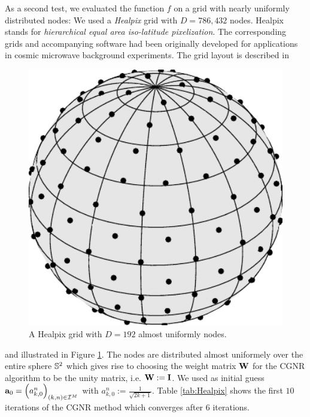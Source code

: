 \begin{example}
    As a second test, we evaluated the function $f$ on a grid with nearly uniformly distributed
    nodes: We used a \emph{Healpix} grid with $D=786,432$ nodes. Healpix stands for 
    \emph{hierarchical equal area iso-latitude pixelization}. The corresponding grids 
    and accompanying software had been originally developed for applications in 
    cosmic microwave background experiments. The grid layout is described in  
    \begin{figure}[tb]
      \centering
      \includegraphics[width=12cm]{images/healpix}
      \caption{A Healpix grid with $D = 192$ almost uniformly nodes.}
      \label{Applications:healpix}
    \end{figure}  
    \cite{healpix} and illustrated in Figure \ref{Applications:healpix}. The nodes are distributed 
    almost uniformely over the entire sphere $\mathbb{S}^2$ which gives rise to choosing the weight matrix 
    $\mathbf{W}$ for the CGNR algorithm to be the unity matrix, i.e. $\mathbf{W} := \mathbf{I}$. We used as 
    initial guess $\mathbf{a}_{0} = \left(a_{k,0}^n\right)_{(k,n) \in \mathcal{I}^M}$ with $a_{k,0}^n := 
    \frac{1}{\sqrt{2k+1}}$. Table \ref{tab:Healpix} shows the first $10$ iterations of the CGNR method which 
    converges after 6 iterations.    
    

\end{example}
